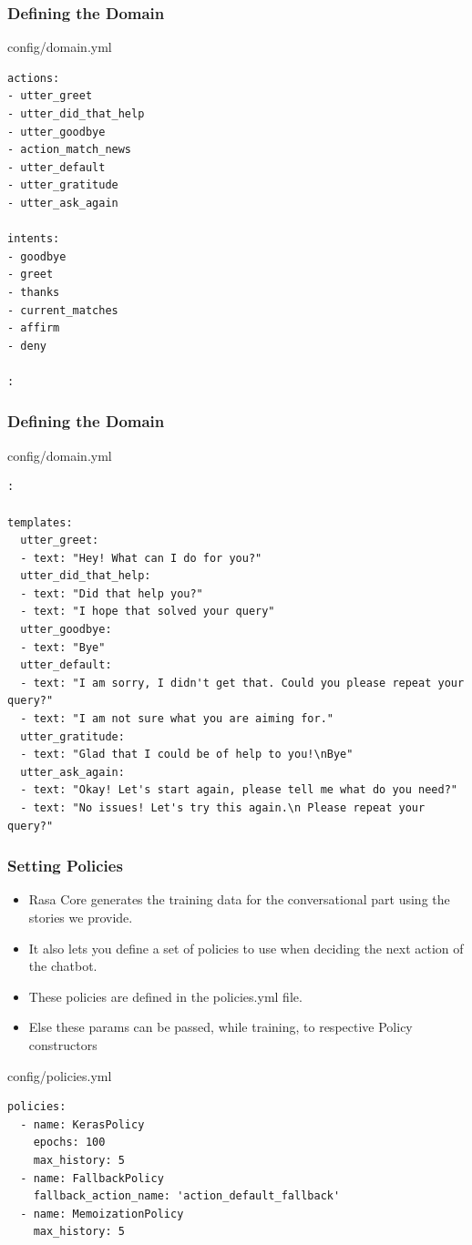  \begin{frame}[fragile]\frametitle{Defining the Domain}

config/domain.yml
\begin{lstlisting}
actions:
- utter_greet
- utter_did_that_help
- utter_goodbye
- action_match_news
- utter_default
- utter_gratitude
- utter_ask_again

intents:
- goodbye
- greet
- thanks
- current_matches
- affirm
- deny

:
\end{lstlisting}


\end{frame}


 \begin{frame}[fragile]\frametitle{Defining the Domain}

config/domain.yml
\begin{lstlisting}
:

templates:
  utter_greet:
  - text: "Hey! What can I do for you?"
  utter_did_that_help:
  - text: "Did that help you?"
  - text: "I hope that solved your query"
  utter_goodbye:
  - text: "Bye"
  utter_default:
  - text: "I am sorry, I didn't get that. Could you please repeat your query?"
  - text: "I am not sure what you are aiming for."
  utter_gratitude:
  - text: "Glad that I could be of help to you!\nBye"
  utter_ask_again:
  - text: "Okay! Let's start again, please tell me what do you need?"
  - text: "No issues! Let's try this again.\n Please repeat your query?"
\end{lstlisting}


\end{frame}

 \begin{frame}[fragile]\frametitle{Setting Policies}

 
\begin{itemize}
\item Rasa Core generates the training data for the conversational part using the stories we provide. 
\item It also lets you define a set of policies to use when deciding the next action of the chatbot. \item These policies are defined in the policies.yml file.
\item Else these params can be passed, while training, to respective Policy constructors
\end{itemize}

config/policies.yml

\begin{lstlisting}
policies:
  - name: KerasPolicy
    epochs: 100
    max_history: 5
  - name: FallbackPolicy
    fallback_action_name: 'action_default_fallback'
  - name: MemoizationPolicy
    max_history: 5
\end{lstlisting}
\end{frame}

